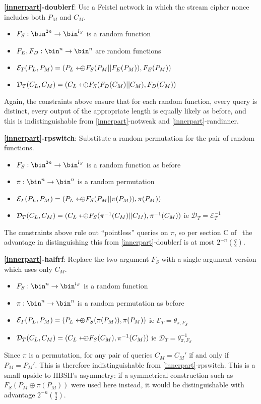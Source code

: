 \documentclass[journal=tosc,preprint,floatrow,submission]{iacrtrans}
\newcommand*{\arrowoplus}{\leftarrow\mkern-12mu\oplus}
\newcommand*{\xprm}[2]{\textsf{\ref*{#1}-#2}}
\newcommand*{\xprmtitle}[2]{\textbf{\xprm{#1}{#2}}}
\newcommand*{\calE}{\mathcal{E}}
\newcommand*{\calD}{\mathcal{D}}
\begin{document}
\xprmtitle{innerpart}{doublerf}: Use a Feistel network in which the stream cipher
nonce includes both $P_M$ and $C_M$.
\begin{itemize}
    \item $F_S: \bin^{2n} \rightarrow \bin^{l_S}$ is a random
    function
    \item $F_E, F_D: \bin^n \rightarrow \bin^n$ are random functions
    \item $\calE_T(P_L, P_M) = (P_L \arrowoplus F_S(P_M || F_E(P_M)), F_E(P_M))$
    \item $\calD_T(C_L, C_M) = (C_L \arrowoplus F_S(F_D(C_M) || C_M), F_D(C_M))$
\end{itemize}
Again, the constraints above ensure that for each random function,
every query is distinct,
every output of the appropriate length is equally
likely as before, and this is indistinguishable from
\xprm{innerpart}{notweak} and \xprm{innerpart}{randinner}.

\xprmtitle{innerpart}{rpswitch}: Substitute a random permutation for the pair of random functions.
\begin{itemize}
    \item $F_S: \bin^{2n} \rightarrow \bin^{l_S}$ is a random function as before
    \item $\pi: \bin^n \rightarrow \bin^n$ is a random permutation
    \item $\calE_T(P_L, P_M) = (P_L \arrowoplus F_S(P_M || \pi(P_M)), \pi(P_M))$
    \item $\calD_T(C_L, C_M) = (C_L \arrowoplus F_S(\pi^{-1}(C_M) || C_M), \pi^{-1}(C_M))$
    ie $\calD_T = \calE_T^{-1}$
\end{itemize}
The constraints above rule out ``pointless'' queries on $\pi$, so per section C of~\cite{cmc}
the advantage in distinguishing this from \xprm{innerpart}{doublerf} is at most
$2^{-n}\binom{q}{2}$.

\xprmtitle{innerpart}{halfrf}: Replace the two-argument $F_S$ with
a single-argument version which uses only $C_M$.
\begin{itemize}
    \item $F_S: \bin^n \rightarrow \bin^{l_S}$ is a random function
    \item $\pi: \bin^n \rightarrow \bin^n$ is a random permutation as before
    \item $\calE_T(P_L, P_M) = (P_L \arrowoplus F_S(\pi(P_M)), \pi(P_M))$
    ie $\calE_T = \theta_{\pi, F_S}$
    \item $\calD_T(C_L, C_M) = (C_L \arrowoplus F_S(C_M), \pi^{-1}(C_M))$
    ie $\calD_T = \theta_{\pi, F_S}^{-1}$
\end{itemize}
Since $\pi$ is a permutation,
for any pair of queries $C_M = C_M'$ if and only if $P_M = P_M'$.
This is therefore indistinguishable from \xprm{innerpart}{rpswitch}.
This is a small upside to HBSH's asymmetry: if a symmetrical
construction such as $F_S(P_M \oplus \pi(P_M))$ were used here instead, it would be
distinguishable with advantage $2^{-n}\binom{q}{2}$.
\end{document}
